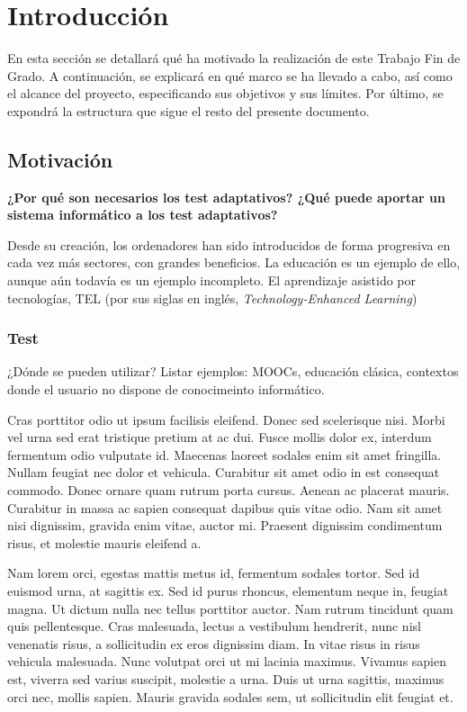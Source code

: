 \chapter{Introducción \label{sec:introduccion}}

En esta sección se detallará qué ha motivado la realización de este Trabajo Fin de Grado. A continuación, se explicará en qué marco se ha llevado a cabo, así como el alcance del proyecto, especificando sus objetivos y sus límites. Por último, se expondrá  la estructura que sigue el resto del presente documento.

\section{Motivación}

\textbf{¿Por qué son necesarios los test adaptativos?
¿Qué puede aportar un sistema informático a los test adaptativos?}

Desde su creación, los ordenadores han sido introducidos de forma progresiva en cada vez más sectores, con grandes beneficios. La educación es un ejemplo de ello, aunque aún todavía es un ejemplo incompleto. El aprendizaje asistido por tecnologías, \gls{TEL} (por sus siglas en inglés, \textit{Technology-Enhanced Learning})

\subsection{Test}
¿Dónde se pueden utilizar?
Listar ejemplos: MOOCs, educación clásica, contextos donde el usuario no dispone de conocimeinto informático.

Cras porttitor odio ut ipsum facilisis eleifend. Donec sed scelerisque nisi. Morbi vel urna sed erat tristique pretium at ac dui. Fusce mollis dolor ex, interdum fermentum odio vulputate id. Maecenas laoreet sodales enim sit amet fringilla. Nullam feugiat nec dolor et vehicula. Curabitur sit amet odio in est consequat commodo. Donec ornare quam rutrum porta cursus. Aenean ac placerat mauris. Curabitur in massa ac sapien consequat dapibus quis vitae odio. Nam sit amet nisi dignissim, gravida enim vitae, auctor mi. Praesent dignissim condimentum risus, et molestie mauris eleifend a.

Nam lorem orci, egestas mattis metus id, fermentum sodales tortor. Sed id euismod urna, at sagittis ex. Sed id purus rhoncus, elementum neque in, feugiat magna. Ut dictum nulla nec tellus porttitor auctor. Nam rutrum tincidunt quam quis pellentesque. Cras malesuada, lectus a vestibulum hendrerit, nunc nisl venenatis risus, a sollicitudin ex eros dignissim diam. In vitae risus in risus vehicula malesuada. Nunc volutpat orci ut mi lacinia maximus. Vivamus sapien est, viverra sed varius suscipit, molestie a urna. Duis ut urna sagittis, maximus orci nec, mollis sapien. Mauris gravida sodales sem, ut sollicitudin elit feugiat et.

